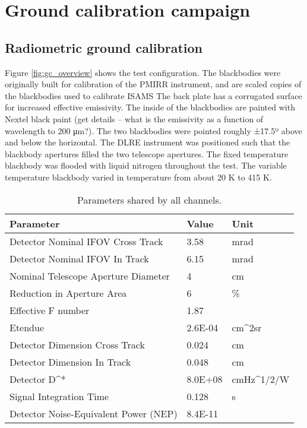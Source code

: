 \section{Ground calibration campaign}

\subsection{Radiometric ground calibration}
Figure \ref{fig:gc_overview} shows the test configuration.  The blackbodies were originally built for calibration of the PMIRR instrument, and are scaled copies of the blackbodies used to calibrate ISAMS \cite{Nightingale_1991} The back plate has a corrugated surface for increased effective emissivity.  The inside of the blackbodies are painted with Nextel black paint (get details – what is the emissivity as a function of wavelength to 200 μm?).  The two blackbodies were pointed roughly ±17.5º above and below the horizontal.  The DLRE instrument was positioned such that the blackbody apertures filled the two telescope apertures.  The fixed temperature blackbody was flooded with liquid nitrogen throughout the test.  The variable temperature blackbody varied in temperature from about 20 K to 415 K.
\begin{table}
\begin{tabular}{lll}
Parameter & Value & Unit\\
\hline
Detector Nominal IFOV Cross Track & 3.58 & mrad \\
Detector Nominal IFOV In Track & 6.15 & mrad \\
Nominal Telescope Aperture Diameter & 4 & cm\\
Reduction in Aperture Area & 6 & \% \\
Effective F number & 1.87 & \\
Etendue & 2.6E-04 & cm^{2}sr \\
Detector Dimension Cross Track & 0.024 & cm \\
Detector Dimension In Track & 0.048 & cm \\
Detector D^* & 8.0E+08 & cmHz^{1/2}/W \\
Signal Integration Time & 0.128 & s \\
Detector Noise-Equivalent Power (NEP) & 8.4E-11 & \\
\hline
\end{tabular}
\caption{\label{tab:parameters_shared} Parameters shared by all channels.}
\end{table}

